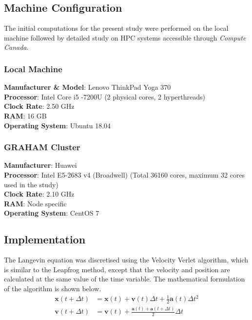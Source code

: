 \documentclass[11pt, oneside]{article}
\begin{document}
\subsection{Machine Configuration}
The initial computations for the present study were performed on the local machine followed by detailed study on HPC systems accessible through \textit{Compute Canada}.
      \subsubsection{Local Machine}
        \textbf{Manufacturer \& Model}: Lenovo ThinkPad Yoga 370\\
	\textbf{Processor}: Intel Core i5 -7200U (2 physical cores, 2 hyperthreads)\\
	\textbf{Clock Rate}:  2.50 GHz\\
	\textbf{RAM}:  16 GB\\
	\textbf{Operating System}: Ubuntu 18.04\\

       \subsubsection{GRAHAM Cluster}
        \textbf{Manufacturer}: Huawei\\
	\textbf{Processor}: Intel E5-2683 v4 (Broadwell) (Total 36160 cores, maximum 32 cores used in the study)\\
	\textbf{Clock Rate}:  2.10 GHz\\
	\textbf{RAM}:  Node specific\\
	\textbf{Operating System}: CentOS 7\

	
\subsection{Implementation}
The Langevin equation was discretised using the Velocity Verlet algorithm, which is similar to the Leapfrog method, except that the velocity and position are calculated at the same value of the time variable. The mathematical formulation of the algorithm is shown below.
\begin{equation}
  \begin{split}
    \mathbf{x}(t + \Delta t) &= \mathbf{x}(t) +  \mathbf{v}(t)\Delta t + \frac{1}{2} \mathbf{a}(t) \Delta t^2 \\
    \mathbf{v}(t + \Delta t) &= \mathbf{v}(t) + \frac{\mathbf{a}(t) + \mathbf{a}(t+\Delta t)}{2} \Delta t \\
  \end{split}
\end{equation}
\end{document}
